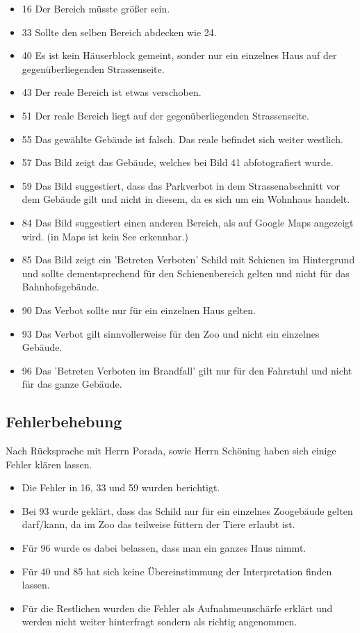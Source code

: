 \begin{itemize}
\itemsep0pt
\item 16 Der Bereich müsste größer sein.
\item 33 Sollte den selben Bereich abdecken wie 24.
\item 40 Es ist kein Häuserblock gemeint, sonder nur ein einzelnes Haus auf der gegenüberliegenden Strassenseite.
\item 43 Der reale Bereich ist etwas verschoben.
\item 51 Der reale Bereich liegt auf der gegenüberliegenden Strassenseite.
\item 55 Das gewählte Gebäude ist falsch. Das reale befindet sich weiter westlich.
\item 57 Das Bild zeigt das Gebäude, welches bei Bild 41 abfotografiert wurde.
\item 59 Das Bild suggestiert, dass das Parkverbot in dem Strassenabschnitt vor dem Gebäude gilt und nicht in diesem, da es sich um ein Wohnhaus handelt.
\item 84 Das Bild suggestiert einen anderen Bereich, als auf Google Maps angezeigt wird. (in Maps ist kein See erkennbar.)
\item 85 Das Bild zeigt ein 'Betreten Verboten' Schild mit Schienen im Hintergrund und sollte dementsprechend für den Schienenbereich gelten und nicht für das Bahnhofsgebäude.
\item 90 Das Verbot sollte nur für ein einzelnen Haus gelten.
\item 93 Das Verbot gilt sinnvollerweise für den Zoo und nicht ein einzelnes Gebäude.
\item 96 Das 'Betreten Verboten im Brandfall' gilt nur für den Fahrstuhl und nicht für das ganze Gebäude.
\end{itemize}

\subsection{Fehlerbehebung}
Nach Rücksprache mit Herrn Porada, sowie Herrn Schöning haben sich einige Fehler klären lassen.
\begin{itemize}
\itemsep0pt
\item Die Fehler in 16, 33 und 59 wurden berichtigt.
\item Bei 93 wurde geklärt, dass das Schild nur für ein einzelnes Zoogebäude gelten darf/kann, da im Zoo das teilweise füttern der Tiere erlaubt ist.
\item Für 96 wurde es dabei belassen, dass man ein ganzes Haus nimmt.
\item Für 40 und 85 hat sich keine Übereinstimmung der Interpretation finden lassen.
\item Für die Restlichen wurden die Fehler als Aufnahmeunschärfe erklärt und werden nicht weiter hinterfragt sondern als richtig angenommen.
\end{itemize}


